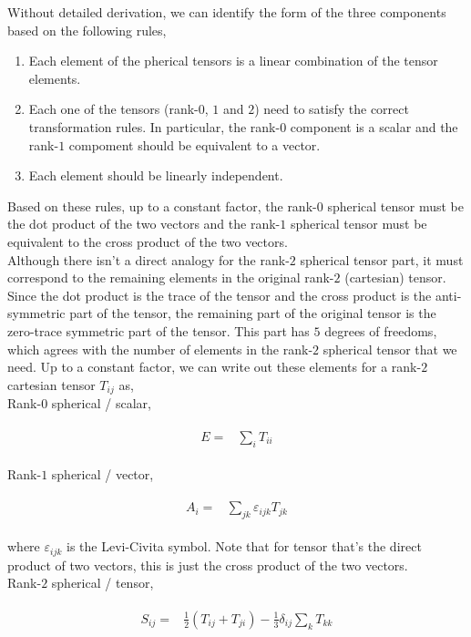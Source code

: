 \documentclass[10pt,fleqn]{article}
\newcommand{\eqar}[1]
{
  \begin{align}
    #1
  \end{align}
}
\newcommand{\paren}[1]{{\left({#1}\right)}}
\begin{document}
Without detailed derivation, we can identify the form of the three components based on
the following rules,
\begin{enumerate}
\item Each element of the pherical tensors is a linear combination
  of the tensor elements.
\item Each one of the tensors (rank-$0$, $1$ and $2$) need to satisfy
  the correct transformation rules.
  In particular, the rank-$0$ component is a scalar
  and the rank-$1$ compoment should be equivalent to a vector.
\item Each element should be linearly independent.
\end{enumerate}
Based on these rules, up to a constant factor,
the rank-$0$ spherical tensor must be the dot product of the two vectors
and the rank-$1$ spherical tensor must be equivalent to the cross product
of the two vectors.\\

Although there isn't a direct analogy for the rank-$2$ spherical tensor part,
it must correspond to the remaining elements in the original
rank-$2$ (cartesian) tensor.
Since the dot product is the trace of the tensor and the cross product
is the anti-symmetric part of the tensor, the remaining part of the original tensor
is the zero-trace symmetric part of the tensor. This part has $5$ degrees of freedoms,
which agrees with the number of elements
in the rank-$2$ spherical tensor that we need.
Up to a constant factor, we can write out these elements for
a rank-$2$ cartesian tensor $T_{ij}$ as,\\

Rank-$0$ spherical / scalar,
\eqar{
  \begin{split}
    E=&\sum_{i}T_{ii}
  \end{split}\label{eq:scalar-compoments}
}
Rank-$1$ spherical / vector,
\eqar{
  \begin{split}
    A_i=&\sum_{jk}\varepsilon_{ijk}T_{jk}
  \end{split}\label{eq:vector-compoments}
}
where $\varepsilon_{ijk}$ is the Levi-Civita symbol.
Note that for tensor that's the direct product of two vectors,
this is just the cross product of the two vectors.\\

Rank-$2$ spherical / tensor,
\eqar{
  \begin{split}
    S_{ij}=&\frac12\paren{T_{ij}+T_{ji}}-\frac13\delta_{ij}\sum_{k}T_{kk}
  \end{split}\label{eq:symm-tensor-compoments}
}
\end{document}
